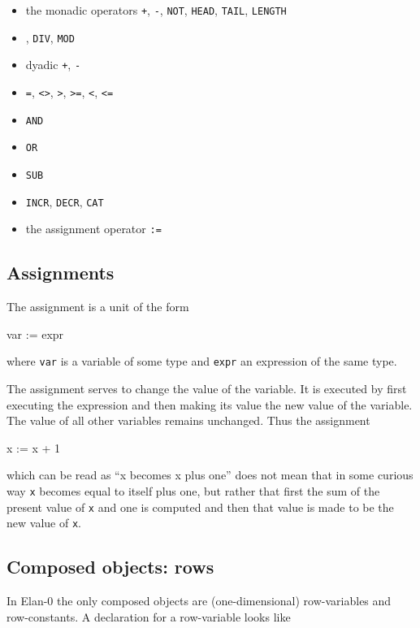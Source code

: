 \begin{itemize}
\item the monadic operators {\tt +}, {\tt -}, {\tt NOT}, {\tt HEAD}, {\tt TAIL}, {\tt LENGTH}
\item {\tt *}, {\tt DIV}, {\tt MOD}
\item dyadic {\tt +}, {\tt -}
\item {\tt =}, {\tt <>}, {\tt >}, {\tt >=}, {\tt <}, {\tt <=}
\item {\tt AND}
\item {\tt OR}
\item {\tt SUB}
\item {\tt INCR}, {\tt DECR}, {\tt CAT}
\item the assignment operator {\tt :=}
\end{itemize}

\subsection{Assignments}

The assignment is a unit of the form

\begin{elan}
        var := expr
\end{elan}

\noindent
where {\tt var} is a variable of some type and {\tt expr} an
expression of the same type.

The assignment serves to change the value of the variable. It
is executed by first executing the expression and then making
its value the new value of the variable. The value of all other
variables remains unchanged.
Thus the assignment

\begin{elan}
        x := x + 1
\end{elan}

\noindent
which can be read as ``x becomes x plus one'' does not mean that
in some curious way {\tt x} becomes equal to itself plus one,
but rather that first the sum of the present value of {\tt x}
and one is computed and then that value is made to be the new
value of {\tt x}.

\subsection{Composed objects: rows}

In Elan-0 the only composed objects are (one-dimensional) row-variables
and row-constants. A declaration for a row-variable looks like

